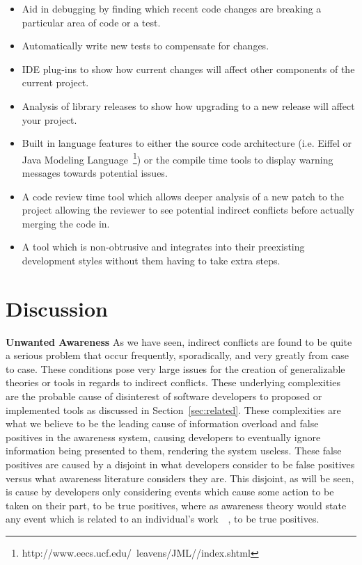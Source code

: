 \documentclass[conference]{IEEEtran}
\begin{document}
\begin{itemize}
	\item Aid in debugging by finding which recent code changes are breaking a particular area of code or a test.
	\item Automatically write new tests to compensate for changes.
	\item IDE plug-ins to show how current changes will affect other components of the current project.
	\item Analysis of library releases to show how upgrading to a new release will affect your project.
	\item Built in language features to either the source code architecture (i.e. Eiffel or 
				Java Modeling Language~\footnote{http://www.eecs.ucf.edu/~leavens/JML//index.shtml}) or the compile 
				time tools to display warning messages towards potential issues.
	\item A code review time tool which allows deeper analysis of a new patch to the project allowing the reviewer to see potential 
				indirect conflicts before actually merging the code in.
	\item A tool which is non-obtrusive and integrates into their preexisting development styles without them having to take extra steps.
\end{itemize}

\section{Discussion}
\label{sec:disc}

\textbf{Unwanted Awareness} As we have seen, indirect conflicts are found to be quite a serious problem that occur frequently,
sporadically, and very greatly from case to case. These conditions pose very large issues for the creation of generalizable theories
or tools in regards to indirect conflicts. These underlying complexities are the probable cause of disinterest of software developers
to proposed or implemented tools as discussed in Section~\ref{sec:related}. These complexities are what we believe to be the
leading cause of information overload and false positives in the awareness system, causing developers to eventually ignore 
information being presented to them, rendering the system useless. These false positives are caused by a disjoint in what
developers consider to be false positives versus what awareness literature considers they are. This disjoint, as will
be seen, is cause by developers only considering events which cause some action to be taken on their part, to be true positives,
where as awareness theory would state any event which is related to an individual's 
work~\cite{Herbsleb06collaborationin}~\cite{Cataldo:2008:SCF}, to be true positives.
\end{document}
